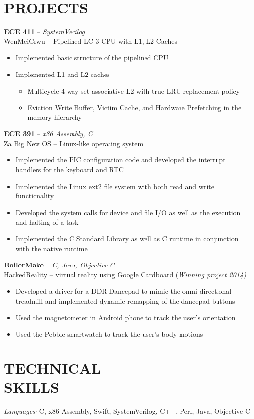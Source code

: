 \documentclass[resmargin]{res}
\begin{document}
\begin{resume}
\section{PROJECTS} 
{\bf ECE 411} -- {\sl SystemVerilog} \\ 
\textnormal {WenMeiCrwu -- Pipelined LC-3 CPU with L1, L2 Caches} 
\begin{itemize} \itemsep -2pt
\vspace {.5mm}
\item Implemented basic structure of the pipelined CPU
\item Implemented L1 and L2 caches 
	\begin{itemize} \itemsep -2pt
	\vspace{-2mm}
	\item Multicycle 4-way set associative L2 with true LRU replacement policy
	\vspace{0.5mm}
	\item Eviction Write Buffer, Victim Cache, and Hardware Prefetching in the memory hierarchy
	\vspace{-1.5mm}
	\end{itemize}
\end{itemize}
\vspace{-4mm}
{\bf ECE 391} -- {\sl x86 Assembly, C} \\ 
\textnormal {Za Big New OS -- Linux-like operating system} 
\begin{itemize} \itemsep -2pt
\vspace {.5mm}
\item Implemented the PIC configuration code and developed the interrupt handlers for the keyboard and RTC
\item Implemented the Linux ext2 file system with both read and write functionality
\item Developed the system calls for device and file I/O as well as the execution and halting of a task
\item Implemented the C Standard Library as well as C runtime in conjunction with the native runtime 
\end{itemize}
\vspace{-3mm}
{\bf BoilerMake} -- {\sl C, Java, Objective-C} \\
\textnormal {HackedReality -- virtual reality using Google Cardboard} (\sl {Winning project 2014})
\begin{itemize} \itemsep -2pt
\item Developed a driver for a DDR Dancepad to mimic the omni-directional treadmill and implemented dynamic remapping of the dancepad buttons
\item Used the magnetometer in Android phone to track the user's orientation
\item Used the Pebble smartwatch to track the user's body motions
\end{itemize}
\vspace{-3mm}

\section{TECHNICAL \\ SKILLS} {\sl Languages:} C, x86 Assembly, Swift, SystemVerilog, C++, Perl, Java, Objective-C

\end{resume}
\end{document}
